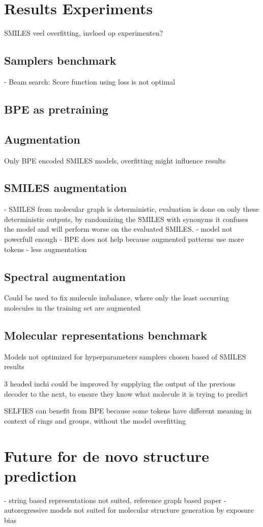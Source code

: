 \section{Results Experiments}

SMILES veel overfitting, invloed op experimenten?

\subsection{Samplers benchmark}

- Beam search: Score function using loss is not optimal
\subsection{\ac{BPE} as pretraining}


\subsection{Augmentation}
Only BPE encoded SMILES models, overfitting might influence results

\subsection{SMILES augmentation}
- SMILES from molecular graph is deterministic, evaluation is done on only these deterministic outputs, by randomizing the SMILES with synonyms it confuses the model and will perform worse on the evaluated SMILES.
- model not powerfull enough
- BPE does not help because augmented patterns use more tokens
- less augmentation

\subsection{Spectral augmentation}

Could be used to fix mulecule imbalance, where only the least occurring molecules in the training set are augmented


\subsection{Molecular representations benchmark}

Models not optimized for hyperparameters
samplers chosen based of SMILES results

3 headed inchi could be improved by supplying the output of the previous decoder to the next, to ensure they know what molecule it is trying to predict

SELFIES can benefit from BPE because some tokens have different meaning in context of rings and groups, without the model overfitting

\section{Future for de novo structure prediction}

- string based representations not suited, reference graph based paper
- autoregressive models not suited for molecular structure generation by exposure bias